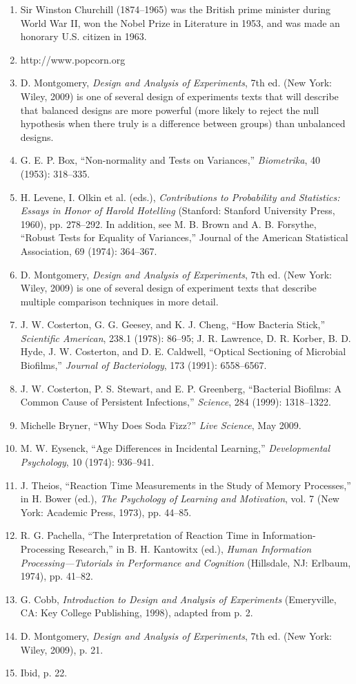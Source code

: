 \documentclass[
]{book}
\begin{document}
\begin{enumerate}

\item Sir Winston Churchill (1874–1965) was the British prime minister during World War II, won the Nobel Prize in
Literature in 1953, and was made an honorary U.S. citizen in 1963.
\item http://www.popcorn.org
\item D. Montgomery, \textit{Design and Analysis of Experiments}, 7th ed. (New York: Wiley, 2009) is one of several design of
experiments texts that will describe that balanced designs are more powerful (more likely to reject the null hypothesis
when there truly is a difference between groups) than unbalanced designs.
\item G. E. P. Box, “Non-normality and Tests on Variances,” \textit{Biometrika}, 40 (1953): 318–335.
\item H. Levene, I. Olkin et al. (eds.), \textit{Contributions to Probability and Statistics: Essays in Honor of Harold Hotelling}
(Stanford: Stanford University Press, 1960), pp. 278–292. In addition, see M. B. Brown and A. B. Forsythe, “Robust
Tests for Equality of Variances,” Journal of the American Statistical Association, 69 (1974): 364–367.
\item D. Montgomery, \textit{Design and Analysis of Experiments}, 7th ed. (New York: Wiley, 2009) is one of several design of
experiment texts that describe multiple comparison techniques in more detail.
\item J. W. Costerton, G. G. Geesey, and K. J. Cheng, “How Bacteria Stick,” \textit{Scientific American}, 238.1 (1978): 86–95;
J. R. Lawrence, D. R. Korber, B. D. Hyde, J. W. Costerton, and D. E. Caldwell, “Optical Sectioning of Microbial
Biofilms,” \textit{Journal of Bacteriology}, 173 (1991): 6558–6567.
\item J. W. Costerton, P. S. Stewart, and E. P. Greenberg, “Bacterial Biofilms: A Common Cause of Persistent Infections,”
\textit{Science}, 284 (1999): 1318–1322.
\item Michelle Bryner, “Why Does Soda Fizz?” \textit{Live Science}, May 2009.
\item M. W. Eysenck, “Age Differences in Incidental Learning,” \textit{Developmental Psychology}, 10 (1974): 936–941.
\item J. Theios, “Reaction Time Measurements in the Study of Memory Processes,” in H. Bower (ed.), \textit{The Psychology of
Learning and Motivation}, vol. 7 (New York: Academic Press, 1973), pp. 44–85.
\item R. G. Pachella, “The Interpretation of Reaction Time in Information-Processing Research,” in B. H. Kantowitx (ed.),
\textit{Human Information Processing—Tutorials in Performance and Cognition} (Hillsdale, NJ: Erlbaum, 1974), pp. 41–82.
\item G. Cobb, \textit{Introduction to Design and Analysis of Experiments} (Emeryville, CA: Key College Publishing, 1998),
adapted from p. 2.
\item D. Montgomery, \textit{Design and Analysis of Experiments}, 7th ed. (New York: Wiley, 2009), p. 21.
\item Ibid, p. 22.

\end{enumerate}
\end{document}
